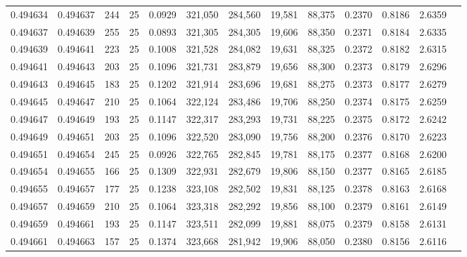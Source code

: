 \begin{tabular}{rrrrrrrrrrrrr}
0.494634 & 0.494637 &   244 &  25 &                                     0.0929 & 321,050 & 284,560 &  19,581 &  88,375 & 0.2370 & 0.8186 & 2.6359 \\
0.494637 & 0.494639 &   255 &  25 &                                     0.0893 & 321,305 & 284,305 &  19,606 &  88,350 & 0.2371 & 0.8184 & 2.6335 \\
0.494639 & 0.494641 &   223 &  25 &                                     0.1008 & 321,528 & 284,082 &  19,631 &  88,325 & 0.2372 & 0.8182 & 2.6315 \\
0.494641 & 0.494643 &   203 &  25 &                                     0.1096 & 321,731 & 283,879 &  19,656 &  88,300 & 0.2373 & 0.8179 & 2.6296 \\
0.494643 & 0.494645 &   183 &  25 &                                     0.1202 & 321,914 & 283,696 &  19,681 &  88,275 & 0.2373 & 0.8177 & 2.6279 \\
0.494645 & 0.494647 &   210 &  25 &                                     0.1064 & 322,124 & 283,486 &  19,706 &  88,250 & 0.2374 & 0.8175 & 2.6259 \\
0.494647 & 0.494649 &   193 &  25 &                                     0.1147 & 322,317 & 283,293 &  19,731 &  88,225 & 0.2375 & 0.8172 & 2.6242 \\
0.494649 & 0.494651 &   203 &  25 &                                     0.1096 & 322,520 & 283,090 &  19,756 &  88,200 & 0.2376 & 0.8170 & 2.6223 \\
0.494651 & 0.494654 &   245 &  25 &                                     0.0926 & 322,765 & 282,845 &  19,781 &  88,175 & 0.2377 & 0.8168 & 2.6200 \\
0.494654 & 0.494655 &   166 &  25 &                                     0.1309 & 322,931 & 282,679 &  19,806 &  88,150 & 0.2377 & 0.8165 & 2.6185 \\
0.494655 & 0.494657 &   177 &  25 &                                     0.1238 & 323,108 & 282,502 &  19,831 &  88,125 & 0.2378 & 0.8163 & 2.6168 \\
0.494657 & 0.494659 &   210 &  25 &                                     0.1064 & 323,318 & 282,292 &  19,856 &  88,100 & 0.2379 & 0.8161 & 2.6149 \\
0.494659 & 0.494661 &   193 &  25 &                                     0.1147 & 323,511 & 282,099 &  19,881 &  88,075 & 0.2379 & 0.8158 & 2.6131 \\
0.494661 & 0.494663 &   157 &  25 &                                     0.1374 & 323,668 & 281,942 &  19,906 &  88,050 & 0.2380 & 0.8156 & 2.6116 \\

\end{tabular}

